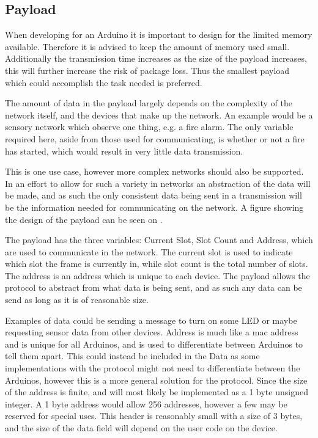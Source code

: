 \subsection{Payload}
When developing for an Arduino it is important to design for the limited memory available.
Therefore it is advised to keep the amount of memory used small.
Additionally the transmission time increases as the size of the payload increases, this will further increase the risk of package loss. 
Thus the smallest payload which could accomplish the task needed is preferred.
 
The amount of data in the payload largely depends on the complexity of the network itself, and the devices that make up the network.
An example would be a sensory network which observe one thing, e.g. a fire alarm. 
The only variable required here, aside from those used for communicating, is whether or not a fire has started, which would result in very little data transmission.

This is one use case, however more complex networks should also be supported. 
In an effort to allow for such a variety in networks an abstraction of the data will be made, and as such the only consistent data being sent in a transmission will be the information needed for communicating on the network.
A figure showing the design of the payload can be seen on .


\noindent%
The payload has the three variables: Current Slot, Slot Count and Address, which are used to communicate in the network.
The current slot is used to indicate which slot the frame is currently in, while slot count is the total number of slots.
The address is an address which is unique to each device. 
The payload allows the protocol to abstract from what data is being sent, and as such any data can be send as long as it is of reasonable size. 

Examples of data could be sending a message to turn on some LED or maybe requesting sensor data from other devices.
Address is much like a mac address and is unique for all Arduinos, and is used to differentiate between Arduinos to tell them apart.
This could instead be included in the Data as some implementations with the protocol might not need to differentiate between the Arduinos, however this is a more general solution for the protocol.
Since the size of the address is finite, and will most likely be implemented as a 1 byte unsigned integer. 
A 1 byte address would allow 256 addresses, however a few may be reserved for special uses.
This header is reasonably small with a size of 3 bytes, and the size of the data field will depend on the user code on the device.
